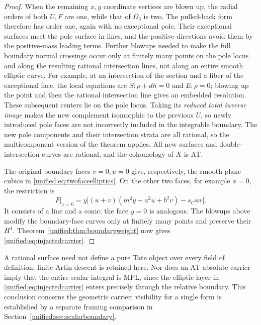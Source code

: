 \documentclass[11pt,a4paper,oneside]{article}
\theoremstyle{plain}
\theoremstyle{definition}
\theoremstyle{remark}
\numberwithin{equation}{section}
\begin{document}
\begin{proof}
When the remaining $x,y$ coordinate vertices are blown up, the radial orders of both $U,F$ are one,
while that of $\Omega_3$ is two. The pulled-back form therefore has order one, again with no exceptional pole.
Their exceptional surfaces meet the pole surface in lines, and the positive directions avoid them by the positive-mass leading terms.
Further blowups needed to make the full boundary normal crossings occur only at finitely many points on the pole locus and along the resulting
rational intersection lines, not along an entire smooth elliptic curve.
For example, at an intersection of the section and a fiber of the exceptional face, the local equations are $S:\rho+dh=0$ and $E:\rho=0$;
blowing up the point and then the rational intersection line gives an embedded resolution.
These subsequent centers lie on the pole locus. Taking its \emph{reduced total inverse image}
makes the new complement isomorphic to the previous $U$, so newly introduced pole faces are not incorrectly included in the integrable boundary.
The new pole components and their intersection strata are all rational, so the multicomponent version of the theorem applies.
All new surfaces and double-intersection curves are rational, and the cohomology of $X$ is AT.

The original boundary faces $v=0,u=0$ give, respectively, the smooth plane cubics in \eqref{unified:eq:twofaceelliptics}.
On the other two faces, for example $x=0$, the restriction is
\[
 F|_{x=0}=y\bigl[(u+v)(m^2y+a^2u+b^2v)-s_Cuv\bigr].
\]
It consists of a line and a conic; the face $y=0$ is analogous.
The blowups above modify the boundary-face curves only at finitely many points and preserve their $H^1$.
Theorem~\ref{unified:thm:boundaryweight} now gives \eqref{unified:eq:injectedcarrier}.
\end{proof}

A rational surface need not define a pure Tate object over every field of definition; finite Artin descent is retained here.
Nor does an AT absolute carrier imply that the entire scalar integral is MPL,
since the elliptic layer in \eqref{unified:eq:injectedcarrier} enters precisely through the relative boundary.
This conclusion concerns the geometric carrier; visibility for a single form is established by a separate framing comparison in Section~\ref{unified:sec:scalarboundary}.
\end{document}
